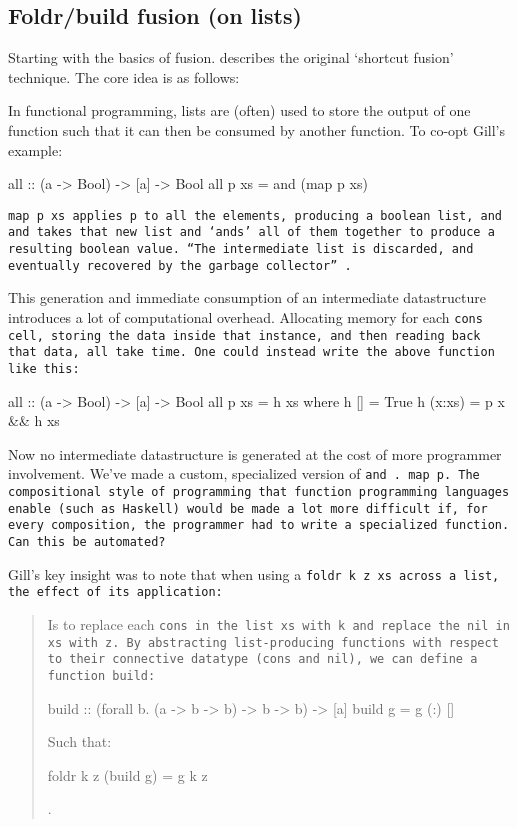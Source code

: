 \subsection{Foldr/build fusion (on lists)}\label{sec:foldr/build}
Starting with the basics of fusion.
\cite{Gill1993} describes the original `shortcut fusion' technique.
The core idea is as follows:

In functional programming, lists are (often) used to store the output of one function such that it can then be consumed by another function. To co-opt Gill's example:
\begin{code}
all :: (a -> Bool) -> [a] -> Bool
all p xs = and (map p xs)
\end{code}

\tt{map p xs} applies \tt{p} to all the elements, producing a boolean list, and \tt{and} takes that new list and `ands' all of them together to produce a resulting boolean value. ``The intermediate list is discarded, and eventually recovered by the garbage collector'' \citep{Gill1993}.

This generation and immediate consumption of an intermediate datastructure introduces a lot of computational overhead. Allocating memory for each \tt{cons} cell, storing the data inside that instance, and then reading back that data, all take time. One could instead write the above function like this:
\begin{code}
all :: (a -> Bool) -> [a] -> Bool
all p xs = h xs
  where h []     = True
        h (x:xs) = p x && h xs
\end{code}
Now no intermediate datastructure is generated at the cost of more programmer involvement. We've made a custom, specialized version of \tt{and~.~map~p}. The compositional style of programming that function programming languages enable (such as Haskell) would be made a lot more difficult if, for every composition, the programmer had to write a specialized function. Can this be automated?

Gill's key insight was to note that when using a \tt{foldr k z xs} across a list, the effect of its application: 

\begin{quotation}
    Is to replace each \tt{cons} in the list \tt{xs} with k and replace the \tt{nil} in \tt{xs} with \tt{z}. By abstracting list-producing functions with respect to their connective datatype (\tt{cons} and \tt{nil}), we can define a function \tt{build}:
\begin{code}
build :: (forall b. (a -> b -> b) -> b -> b) -> [a] 
build g = g (:) []
\end{code}
Such that:
\begin{code}
foldr k z (build g) = g k z
\end{code}
\cite{Gill1993}.
\end{quotation}

